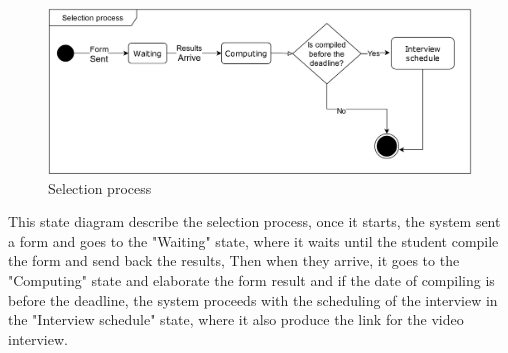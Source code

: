 \begin{figure}[H]
    \centering
    \includegraphics[width=\textwidth]{Images/Selection process.png}
    \caption{Selection process}
    \label{Selection process}
\end{figure}
This state diagram describe the selection process, once it starts, the system sent a form and goes to the "Waiting" state, where it waits until the student compile the form and send back the results, Then when they arrive, it goes to the "Computing" state and elaborate the form result and if the date of compiling is before the deadline, the system proceeds with the scheduling of the interview in the "Interview schedule" state, where it also produce the link for the video interview. 

